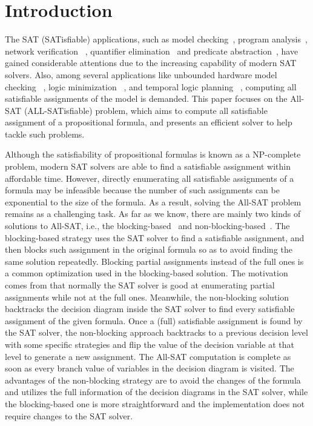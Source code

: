 \section{Introduction}
The SAT (SATisfiable) applications, such as model checking~\cite{bmc,ic3}, program analysis~\cite{klee,cpachecker,cbmc}, network verification ~\cite{lopes2015checking,majumdar2014kuai,zhang2012verification}, quantifier elimination~\cite{brauer2011existential} and predicate abstraction~\cite{lahiri2003symbolic}, have gained considerable attentions due to the increasing capability of modern SAT solvers. 
Also, among several applications like unbounded hardware model checking ~\cite{car}, logic minimization ~\cite{sapra2003sat}, and temporal logic planning ~\cite{aalta}, computing all satisfiable assignments of the model is demanded. This paper focuses on the All-SAT (ALL-SATisfiable) problem, which aims to compute all satisfiable assignment of a propositional formula, and presents an efficient solver \tool to help tackle such problems.

Although the satisfiability of propositional formulas is known as a NP-complete problem, modern SAT solvers are able to find a satisfiable assignment within affordable time. However, directly enumerating all satisfiable assignments of a formula may be infeasible because the number of such assignments can be exponential to the size of the formula. As a result, solving the All-SAT problem remains as a challenging task. As far as we know, there are mainly two kinds of solutions to All-SAT, i.e., the blocking-based~\cite{mcmillan2002applying} and non-blocking-based~\cite{grumberg2004memory}. The blocking-based strategy uses the SAT solver to find a satisfiable assignment, and then blocks such assignment in the original formula so as to avoid finding the same solution repeatedly. Blocking partial assignments instead of the full ones is a common optimization used in the blocking-based solution. The motivation comes from that normally the SAT solver is good at enumerating partial assignments while not at the full ones. 
Meanwhile, the non-blocking solution backtracks the decision diagram inside the SAT solver to find every satisfiable assignment of the given formula. Once a (full) satisfiable assignment is found by the SAT solver, the non-blocking approach backtracks to a previous decision level with some specific strategies and flip the value of the decision variable at that level to generate a new assignment. The All-SAT computation is complete as soon as every branch value of variables in the decision diagram is visited. 
The advantages of the non-blocking strategy are to avoid the changes of the formula and utilizes the full information of the decision diagrams in the SAT solver, while the blocking-based one is more straightforward and the implementation does not require changes to the SAT solver.

